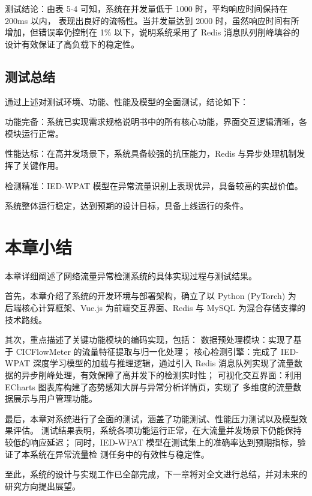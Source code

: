 测试结论：由表 5-4 可知，系统在并发量低于 1000 时，平均响应时间保持在 200ms 以内，
表现出良好的流畅性。当并发量达到 2000 时，虽然响应时间有所增加，但错误率仍控制在 1\% 
以下，说明系统采用了 Redis 消息队列削峰填谷的设计有效保证了高负载下的稳定性。

\subsection{测试总结}

通过上述对测试环境、功能、性能及模型的全面测试，结论如下：

功能完备：系统已实现需求规格说明书中的所有核心功能，界面交互逻辑清晰，各模块运行正常。

性能达标：在高并发场景下，系统具备较强的抗压能力，Redis 与异步处理机制发挥了关键作用。

检测精准：IED-WPAT 模型在异常流量识别上表现优异，具备较高的实战价值。

系统整体运行稳定，达到预期的设计目标，具备上线运行的条件。



\section{本章小结}
本章详细阐述了网络流量异常检测系统的具体实现过程与测试结果。

首先，本章介绍了系统的开发环境与部署架构，确立了以 Python (PyTorch) 为
后端核心计算框架、Vue.js 为前端交互界面、Redis 与 MySQL 为混合存储支撑的技术路线。

其次，重点描述了关键功能模块的编码实现，包括：
数据预处理模块：实现了基于 CICFlowMeter 的流量特征提取与归一化处理；
核心检测引擎：完成了 IED-WPAT 深度学习模型的加载与推理逻辑，通过引入 Redis 
消息队列实现了流量数据的异步削峰处理，有效保障了高并发下的检测实时性；
可视化交互界面：利用 ECharts 图表库构建了态势感知大屏与异常分析详情页，实现了
多维度的流量数据展示与用户管理功能。

最后，本章对系统进行了全面的测试，涵盖了功能测试、性能压力测试以及模型效果评估。
测试结果表明，系统各项功能运行正常，在大流量并发场景下仍能保持较低的响应延迟；
同时，IED-WPAT 模型在测试集上的准确率达到预期指标，验证了本系统在异常流量检
测任务中的有效性与稳定性。

至此，系统的设计与实现工作已全部完成，下一章将对全文进行总结，并对未来的研究方向提出展望。